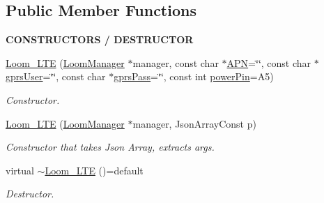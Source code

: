 \subsection*{Public Member Functions}
\begin{Indent}{\bf C\+O\+N\+S\+T\+R\+U\+C\+T\+O\+RS / D\+E\+S\+T\+R\+U\+C\+T\+OR}\par
\begin{DoxyCompactItemize}
\item 
\hyperlink{class_loom___l_t_e_a8d95da5f0fc6bb7362d9bf0b73bb48f4}{Loom\+\_\+\+L\+TE} (\hyperlink{class_loom_manager}{Loom\+Manager} $\ast$manager, const char $\ast$\hyperlink{class_loom___l_t_e_a186a401a887e8fe3d7fdea20ad460647}{A\+PN}=\char`\"{}\char`\"{}, const char $\ast$\hyperlink{class_loom___l_t_e_aea1ba6a0a9f7ed65081b769f53d683ad}{gprs\+User}=\char`\"{}\char`\"{}, const char $\ast$\hyperlink{class_loom___l_t_e_a30c8118155a3c520b09cc6f4cc3e5281}{gprs\+Pass}=\char`\"{}\char`\"{}, const int \hyperlink{class_loom___l_t_e_a2957c4ed2f16b6e5d5efcf26a54ab6f1}{power\+Pin}=A5)
\begin{DoxyCompactList}\small\item\em Constructor. \end{DoxyCompactList}\item 
\hyperlink{class_loom___l_t_e_a1c1062a1f31998a98965d09eca65f10d}{Loom\+\_\+\+L\+TE} (\hyperlink{class_loom_manager}{Loom\+Manager} $\ast$manager, Json\+Array\+Const p)
\begin{DoxyCompactList}\small\item\em Constructor that takes Json Array, extracts args. \end{DoxyCompactList}\item 
virtual \hyperlink{class_loom___l_t_e_aa087493e3ee9044aeef9fbe3e44946f8}{$\sim$\+Loom\+\_\+\+L\+TE} ()=default
\begin{DoxyCompactList}\small\item\em Destructor. \end{DoxyCompactList}\end{DoxyCompactItemize}
\end{Indent}
